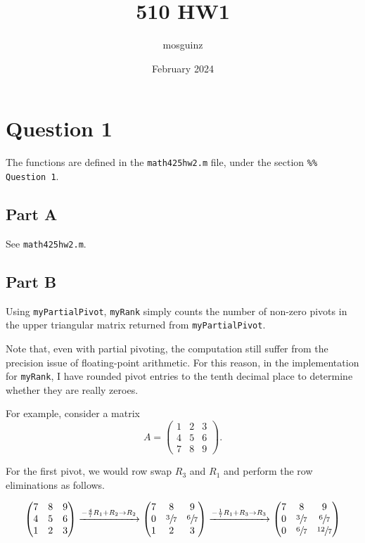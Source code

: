 \documentclass[12pt]{article}
\title{510 HW1}
\author{mosguinz}
\date{February 2024}
\newcommand{\code}[1]{\texttt{#1}}
\begin{document}
\section*{Question 1}

The functions are defined in the \code{math425hw2.m} file, under the section \code{\%\% Question 1}.

\subsection*{Part A}

See \code{math425hw2.m}.

\subsection*{Part B}

Using \code{myPartialPivot}, \code{myRank} simply counts the number of non-zero pivots in the upper triangular matrix returned from \code{myPartialPivot}.

Note that, even with partial pivoting, the computation still suffer from the precision issue of floating-point arithmetic. For this reason, in the implementation for \code{myRank}, I have rounded pivot entries to the tenth decimal place to determine whether they are really zeroes.

For example, consider a matrix
$$
A=\begin{pmatrix}
    1 & 2 & 3 \\ 4 & 5 & 6 \\ 7 & 8 & 9
\end{pmatrix}.
$$

For the first pivot, we would row swap $R_3$ and $R_1$ and perform the row eliminations as follows.

$$
\begin{pmatrix}
     7 & 8 & 9 \\
     4 & 5 & 6 \\
     1 & 2 & 3
\end{pmatrix}
\xrightarrow[]{-\frac{4}{7}R_1 + R_2 \to R_2}
\begin{pmatrix}
     7 & 8 & 9 \\
     0 & \sfrac{3}{7} & \sfrac{6}{7} \\
     1 & 2 & 3
\end{pmatrix}
\xrightarrow[]{-\frac{1}{7}R_1 + R_3 \to R_3}
\begin{pmatrix}
     7 & 8 & 9 \\
     0 & \sfrac{3}{7} & \sfrac{6}{7} \\
     0 & \sfrac{6}{7} & \sfrac{12}{7}
\end{pmatrix}
$$
\end{document}

